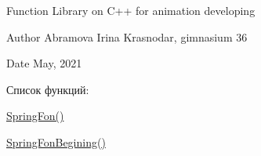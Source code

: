 Function Library on C++ for animation developing\begin{DoxyAuthor}{Author}
Abramova Irina Krasnodar, gimnasium 36
\end{DoxyAuthor}
\begin{DoxyDate}{Date}
May, 2021
\end{DoxyDate}
Список функций\+:


\begin{DoxyItemize}
\item \mbox{\hyperlink{_lib_ira_8h_a470cee4cbc2428b58525c2db88ff780a}{Spring\+Fon()}}
\item \mbox{\hyperlink{_lib_ira_8h_a9e7d180472a189093d1010bef056f1e3}{Spring\+Fon\+Begining()}}
\end{DoxyItemize}

 